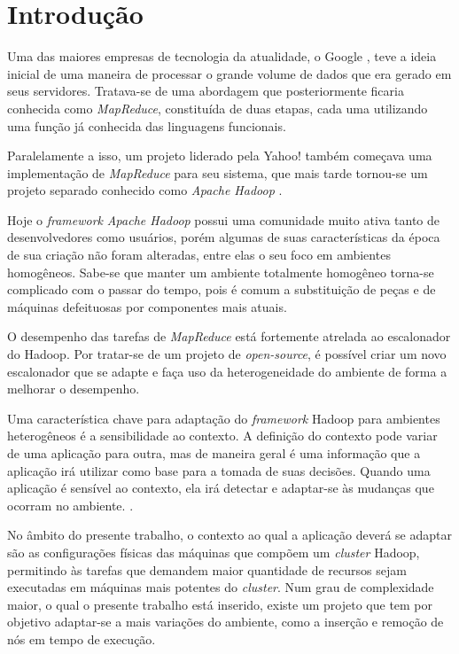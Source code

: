 \chapter{Introdução}
\label{chap:Introducao}
Uma das maiores empresas de tecnologia da atualidade, o Google \cite{Google}, teve a ideia inicial de uma maneira de processar o grande volume de dados que era gerado em seus servidores. Tratava-se de uma abordagem que posteriormente ficaria conhecida como \emph{MapReduce}, constituída de duas etapas, cada uma utilizando uma função já conhecida das linguagens funcionais.

Paralelamente a isso, um projeto liderado pela Yahoo! \cite{Yahoo} também começava uma implementação de \emph{MapReduce} para seu sistema, que mais tarde tornou-se um projeto separado conhecido como \emph{Apache Hadoop} \cite{Hadoop}.

Hoje o \emph{framework} \emph{Apache Hadoop} possui uma comunidade muito ativa tanto de desenvolvedores como usuários, porém algumas de suas características da época de sua criação não foram alteradas, entre elas o seu foco em ambientes homogêneos. Sabe-se que manter um ambiente totalmente homogêneo torna-se complicado com o passar do tempo, pois é comum a substituição de peças e de máquinas defeituosas por componentes mais atuais.

O desempenho das tarefas de \emph{MapReduce} está fortemente atrelada ao escalonador do Hadoop\cite{CASH}. Por tratar-se de um projeto de \emph{open-source}, é possível criar um novo escalonador que se adapte e faça uso da heterogeneidade do ambiente de forma a melhorar o desempenho.

Uma característica chave para adaptação do \emph{framework} Hadoop para ambientes heterogêneos é a sensibilidade ao contexto. A definição do contexto pode variar de uma aplicação para outra, mas de maneira geral é uma informação que a aplicação irá utilizar como base para a tomada de suas decisões. Quando uma aplicação é sensível ao contexto, ela irá detectar e adaptar-se às mudanças que ocorram no ambiente. \cite{Manuele}.

No âmbito do presente trabalho, o contexto ao qual a aplicação deverá se adaptar são as configurações físicas das máquinas que compõem um \emph{cluster} Hadoop, permitindo às tarefas que demandem maior quantidade de recursos sejam executadas em máquinas mais potentes do \emph{cluster}. Num grau de complexidade maior, o qual o presente trabalho está inserido, existe um projeto \cite{PER-MARE} que tem por objetivo adaptar-se a mais variações do ambiente, como a inserção e remoção de nós em tempo de execução.

